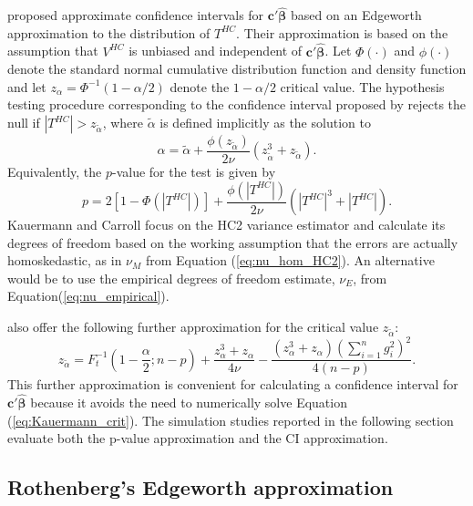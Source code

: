 \documentclass[12pt]{article}\usepackage[]{graphicx}\usepackage[]{color}
\newcommand{\bm}{\mathbf}
\newcommand{\bs}{\boldsymbol}
\begin{document}
\citet{Kauermann2001note} proposed approximate confidence intervals for $\bm{c}'\bs{\hat\beta}$ based on an Edgeworth approximation to the distribution of $T^{HC}$. 
Their approximation is based on the assumption that $V^{HC}$ is unbiased and independent of $\bm{c}'\bs{\hat\beta}$. 
Let $\Phi(\cdot)$ and $\phi(\cdot)$ denote the standard normal cumulative distribution function and density function and let $z_\alpha = \Phi^{-1}\left(1 - \alpha / 2\right)$ denote the $1 - \alpha / 2$ critical value. 
The hypothesis testing procedure corresponding to the confidence interval proposed by \citet{Kauermann2001note} rejects the null if $\left|T^{HC} \right| > z_{\tilde\alpha}$, where $\tilde\alpha$ is defined implicitly as the solution to 
\begin{equation}
\label{eq:Kauermann_crit}
\alpha = \tilde\alpha + \frac{\phi\left(z_{\tilde\alpha}\right)}{2 \nu}\left(z_{\tilde\alpha}^3 + z_{\tilde\alpha}\right).
\end{equation}
Equivalently, the $p$-value for the test is given by 
\begin{equation}
\label{eq:Kauermann_pval}
p = 2 \left[1 - \Phi\left(\left|T^{HC}\right|\right)\right] + \frac{\phi\left(\left|T^{HC}\right|\right)}{2 \nu}\left(\left|T^{HC}\right|^3 + \left|T^{HC}\right|\right).
\end{equation}
Kauermann and Carroll focus on the HC2 variance estimator and calculate its degrees of freedom based on the working assumption that the errors are actually homoskedastic, as in $\nu_M$ from Equation (\ref{eq:nu_hom_HC2}). An alternative would be to use the empirical degrees of freedom estimate, $\nu_E$, from Equation(\ref{eq:nu_empirical}). 

\citet{Kauermann2001note} also offer the following further approximation for the critical value $z_{\tilde\alpha}$:
\begin{equation}
\label{eq:Kauermann_approx}
z_{\tilde\alpha} = F_t^{-1}\left(1 - \frac{\alpha}{2}; n - p\right) + \frac{z_\alpha^3 + z_\alpha}{4 \nu} - \frac{\left(z_\alpha^3 + z_\alpha\right)\left(\sum_{i=1}^n g_i^2\right)^2}{4 (n - p)}.
\end{equation}
This further approximation is convenient for calculating a confidence interval for $\bm{c}'\bs{\hat\beta}$ because it avoids the need to numerically solve Equation (\ref{eq:Kauermann_crit}). 
The simulation studies reported in the following section evaluate both the p-value approximation and the CI approximation.

\subsection{Rothenberg's Edgeworth approximation}
\end{document}
